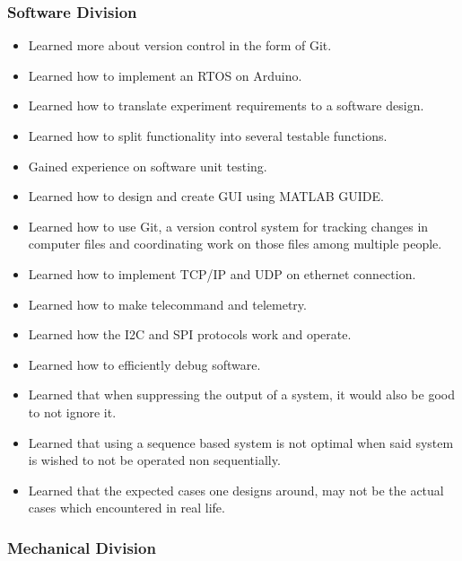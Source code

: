 \begin{itemize}
\end{itemize}


\subsubsection{Software Division}

\begin{itemize}
    \item Learned more about version control in the form of Git.
    \item Learned how to implement an RTOS on Arduino.
    \item Learned how to translate experiment requirements to a software design.
    \item Learned how to split functionality into several testable functions.
    \item Gained experience on software unit testing.
    \item Learned how to design and create GUI using MATLAB GUIDE.
    \item Learned how to use Git, a version control system for tracking changes in computer files and coordinating work on those files among multiple people.
    \item Learned how to implement TCP/IP and UDP on ethernet connection.
    \item Learned how to make telecommand and telemetry.
    \item Learned how the I2C and SPI protocols work and operate.
    \item Learned how to efficiently debug software.
    \item Learned that when suppressing the output of a system, it would also be good to not ignore it.
    \item Learned that using a sequence based system is not optimal when said system  is wished to not be operated non sequentially. 
    \item Learned that the expected cases one designs around, may not be the actual cases which encountered in real life.%
\end{itemize}


\subsubsection{Mechanical Division}

